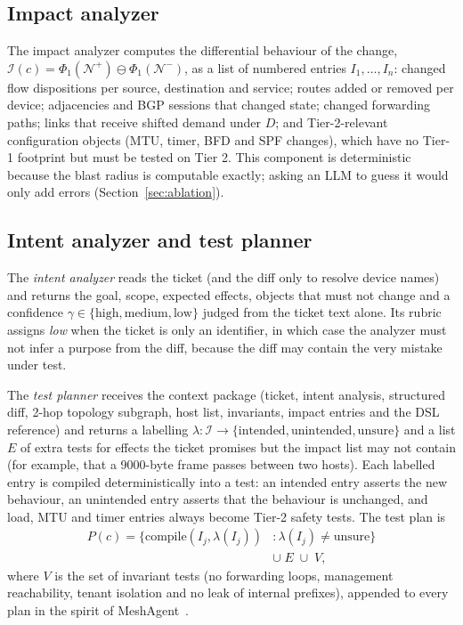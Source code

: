 \documentclass[pdflatex,iicol,sn-mathphys-num]{sn-jnl}%
\theoremstyle{thmstyletwo}%
\begin{document}
\subsection{Impact analyzer}\label{sec:impact}

The impact analyzer computes the differential behaviour of the change, $\mathcal{I}(c)=\Phi_1(\mathcal{N}^{+})\ominus\Phi_1(\mathcal{N}^{-})$, as a list of numbered entries $I_1,\dots,I_n$: changed flow dispositions per source, destination and service; routes added or removed per device; adjacencies and BGP sessions that changed state; changed forwarding paths; links that receive shifted demand under $D$; and Tier-2-relevant configuration objects (MTU, timer, BFD and SPF changes), which have no Tier-1 footprint but must be tested on Tier 2. This component is deterministic because the blast radius is computable exactly; asking an LLM to guess it would only add errors (Section~\ref{sec:ablation}).

\subsection{Intent analyzer and test planner}\label{sec:planner}

The \emph{intent analyzer} reads the ticket (and the diff only to resolve device names) and returns the goal, scope, expected effects, objects that must not change and a confidence $\gamma\in\{\text{high},\text{medium},\text{low}\}$ judged from the ticket text alone. Its rubric assigns \emph{low} when the ticket is only an identifier, in which case the analyzer must not infer a purpose from the diff, because the diff may contain the very mistake under test.

The \emph{test planner} receives the context package (ticket, intent analysis, structured diff, 2-hop topology subgraph, host list, invariants, impact entries and the DSL reference) and returns a labelling $\lambda:\mathcal{I}\rightarrow\{\text{intended},\text{unintended},\text{unsure}\}$ and a list $E$ of extra tests for effects the ticket promises but the impact list may not contain (for example, that a 9000-byte frame passes between two hosts). Each labelled entry is compiled deterministically into a test: an intended entry asserts the new behaviour, an unintended entry asserts that the behaviour is unchanged, and load, MTU and timer entries always become Tier-2 safety tests. The test plan is
\begin{equation}
\begin{split}
P(c) = \{\mathrm{compile}(I_j,\lambda(I_j)) &: \lambda(I_j)\neq\text{unsure}\}\\
&\cup\;E\;\cup\;V,
\end{split}\label{eq:plan}
\end{equation}
where $V$ is the set of invariant tests (no forwarding loops, management reachability, tenant isolation and no leak of internal prefixes), appended to every plan in the spirit of MeshAgent~\cite{zhou2025meshagent}.
\end{document}
